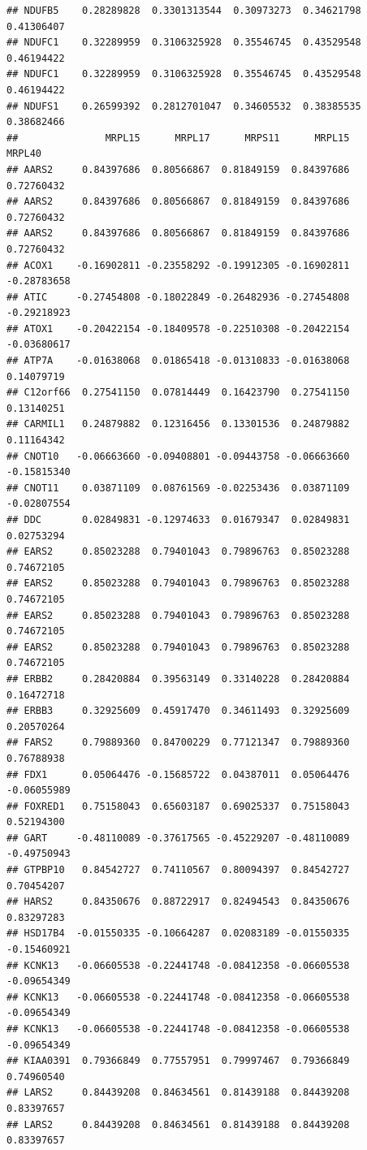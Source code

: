 \documentclass[
]{article}
\begin{document}
\begin{verbatim}
## NDUFB5    0.28289828  0.3301313544  0.30973273  0.34621798  0.41306407
## NDUFC1    0.32289959  0.3106325928  0.35546745  0.43529548  0.46194422
## NDUFC1    0.32289959  0.3106325928  0.35546745  0.43529548  0.46194422
## NDUFS1    0.26599392  0.2812701047  0.34605532  0.38385535  0.38682466
##               MRPL15      MRPL17      MRPS11      MRPL15      MRPL40
## AARS2     0.84397686  0.80566867  0.81849159  0.84397686  0.72760432
## AARS2     0.84397686  0.80566867  0.81849159  0.84397686  0.72760432
## AARS2     0.84397686  0.80566867  0.81849159  0.84397686  0.72760432
## ACOX1    -0.16902811 -0.23558292 -0.19912305 -0.16902811 -0.28783658
## ATIC     -0.27454808 -0.18022849 -0.26482936 -0.27454808 -0.29218923
## ATOX1    -0.20422154 -0.18409578 -0.22510308 -0.20422154 -0.03680617
## ATP7A    -0.01638068  0.01865418 -0.01310833 -0.01638068  0.14079719
## C12orf66  0.27541150  0.07814449  0.16423790  0.27541150  0.13140251
## CARMIL1   0.24879882  0.12316456  0.13301536  0.24879882  0.11164342
## CNOT10   -0.06663660 -0.09408801 -0.09443758 -0.06663660 -0.15815340
## CNOT11    0.03871109  0.08761569 -0.02253436  0.03871109 -0.02807554
## DDC       0.02849831 -0.12974633  0.01679347  0.02849831  0.02753294
## EARS2     0.85023288  0.79401043  0.79896763  0.85023288  0.74672105
## EARS2     0.85023288  0.79401043  0.79896763  0.85023288  0.74672105
## EARS2     0.85023288  0.79401043  0.79896763  0.85023288  0.74672105
## EARS2     0.85023288  0.79401043  0.79896763  0.85023288  0.74672105
## ERBB2     0.28420884  0.39563149  0.33140228  0.28420884  0.16472718
## ERBB3     0.32925609  0.45917470  0.34611493  0.32925609  0.20570264
## FARS2     0.79889360  0.84700229  0.77121347  0.79889360  0.76788938
## FDX1      0.05064476 -0.15685722  0.04387011  0.05064476 -0.06055989
## FOXRED1   0.75158043  0.65603187  0.69025337  0.75158043  0.52194300
## GART     -0.48110089 -0.37617565 -0.45229207 -0.48110089 -0.49750943
## GTPBP10   0.84542727  0.74110567  0.80094397  0.84542727  0.70454207
## HARS2     0.84350676  0.88722917  0.82494543  0.84350676  0.83297283
## HSD17B4  -0.01550335 -0.10664287  0.02083189 -0.01550335 -0.15460921
## KCNK13   -0.06605538 -0.22441748 -0.08412358 -0.06605538 -0.09654349
## KCNK13   -0.06605538 -0.22441748 -0.08412358 -0.06605538 -0.09654349
## KCNK13   -0.06605538 -0.22441748 -0.08412358 -0.06605538 -0.09654349
## KIAA0391  0.79366849  0.77557951  0.79997467  0.79366849  0.74960540
## LARS2     0.84439208  0.84634561  0.81439188  0.84439208  0.83397657
## LARS2     0.84439208  0.84634561  0.81439188  0.84439208  0.83397657

\end{verbatim}
\end{document}
